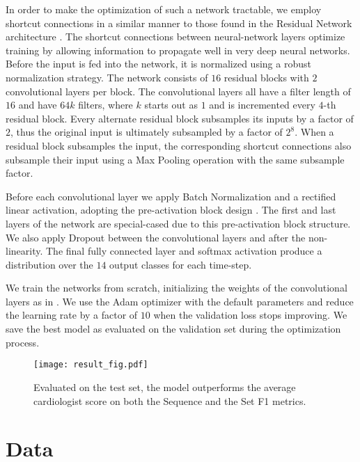 \documentclass{article}
\begin{document}
In order to make the optimization of such a network tractable, we employ shortcut connections in a similar manner to those found in the Residual Network architecture \cite{DBLP:journals/corr/HeZRS15}. The shortcut connections between neural-network layers optimize training by allowing information to propagate well in very deep neural networks. Before the input is fed into the network, it is normalized using a robust normalization strategy. The network consists of $16$ residual blocks with $2$ convolutional layers per block. The convolutional layers all have a filter length of $16$ and have $64k$ filters, where $k$ starts out as $1$ and is incremented every $4$-th residual block. Every alternate residual block subsamples its inputs by a factor of $2$, thus the original input is ultimately subsampled by a factor of $2^8$. When a residual block subsamples the input, the corresponding shortcut connections also subsample their input using a Max Pooling operation with the same subsample factor. 

Before each convolutional layer we apply Batch Normalization \cite{ioffe2015batch} and a rectified linear activation, adopting the pre-activation block design \cite{DBLP:journals/corr/HeZR016}. The first and last layers of the network are special-cased due to this pre-activation block structure. We also apply Dropout \cite{srivastava2014dropout} between the convolutional layers and after the non-linearity. The final fully connected layer and softmax activation produce a distribution over the $14$ output classes for each time-step.

We train the networks from scratch, initializing the weights of the convolutional layers as in \cite{DBLP:journals/corr/HeZR015}. We use the Adam \cite{kingma2014adam} optimizer with the default parameters and reduce the learning rate by a factor of $10$ when the validation loss stops improving. We save the best model as evaluated on the validation set during the optimization process.

\begin{figure}
  \centering
  \texttt{[image: result\_fig.pdf]}
  \caption{
    Evaluated on the test set, the model outperforms the average cardiologist score on both the Sequence and the Set F1 metrics.
  }
  \label{fig:model_vs_cardiol}
\end{figure}

\section{Data}
\label{data}
\end{document}
